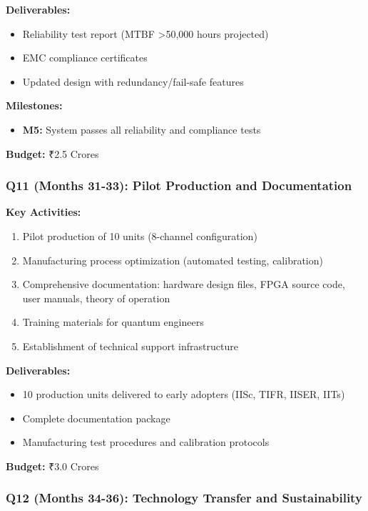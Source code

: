 \documentclass[12pt,a4paper]{article}
\begin{document}
\begin{enumerate}[leftmargin=*]
\textbf{Deliverables:}
\begin{itemize}[leftmargin=*]
    \item Reliability test report (MTBF >50,000 hours projected)
    \item EMC compliance certificates
    \item Updated design with redundancy/fail-safe features
\end{itemize}

\textbf{Milestones:}
\begin{itemize}[leftmargin=*]
    \item \textbf{M5:} System passes all reliability and compliance tests
\end{itemize}

\textbf{Budget:} ₹2.5 Crores

\subsubsection{Q11 (Months 31-33): Pilot Production and Documentation}

\textbf{Key Activities:}
\begin{enumerate}[leftmargin=*]
    \item Pilot production of 10 units (8-channel configuration)
    \item Manufacturing process optimization (automated testing, calibration)
    \item Comprehensive documentation: hardware design files, FPGA source code, user manuals, theory of operation
    \item Training materials for quantum engineers
    \item Establishment of technical support infrastructure
\end{enumerate}

\textbf{Deliverables:}
\begin{itemize}[leftmargin=*]
    \item 10 production units delivered to early adopters (IISc, TIFR, IISER, IITs)
    \item Complete documentation package
    \item Manufacturing test procedures and calibration protocols
\end{itemize}

\textbf{Budget:} ₹3.0 Crores

\subsubsection{Q12 (Months 34-36): Technology Transfer and Sustainability}


\end{enumerate}
\end{document}
